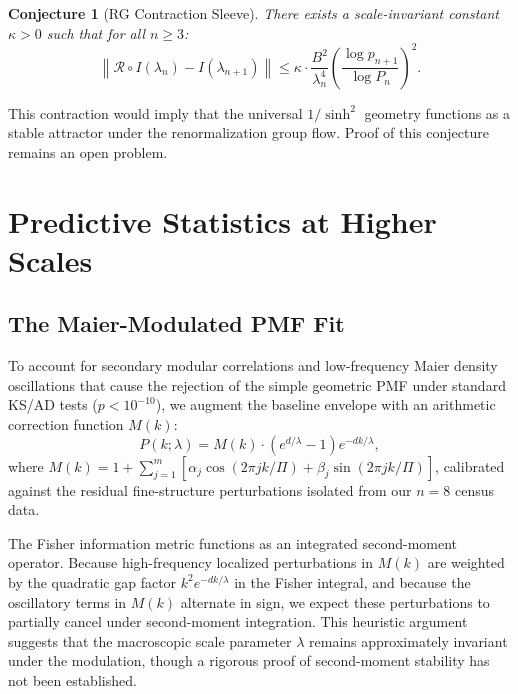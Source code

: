 \documentclass[11pt]{article}
\newtheorem{conjecture}[theorem]{Conjecture}
\theoremstyle{remark}
\begin{document}
\begin{conjecture}[RG Contraction Sleeve]
There exists a scale-invariant constant $\kappa > 0$ such that for all $n \geq 3$:
\begin{equation}
    \left\| \mathcal{R} \circ I(\lambda_n) - I(\lambda_{n+1}) \right\| \le \kappa \cdot \frac{B^2}{\lambda_n^4} \left( \frac{\log p_{n+1}}{\log P_n} \right)^2.
\end{equation}
\end{conjecture}

This contraction would imply that the universal $1/\sinh^2$ geometry functions as a stable attractor under the renormalization group flow. Proof of this conjecture remains an open problem.

\section{Predictive Statistics at Higher Scales}

\subsection{The Maier-Modulated PMF Fit}
To account for secondary modular correlations and low-frequency Maier density oscillations that cause the rejection of the simple geometric PMF under standard KS/AD tests ($p < 10^{-10}$), we augment the baseline envelope with an arithmetic correction function $M(k)$:
\begin{equation}
    P(k; \lambda) = M(k) \cdot \left(e^{d/\lambda} - 1\right) e^{-dk/\lambda},
\end{equation}
where $M(k) = 1 + \sum_{j=1}^{m} [ \alpha_j \cos(2\pi j k / \Pi) + \beta_j \sin(2\pi j k / \Pi) ]$, calibrated against the residual fine-structure perturbations isolated from our $n=8$ census data.

The Fisher information metric functions as an integrated second-moment operator. Because high-frequency localized perturbations in $M(k)$ are weighted by the quadratic gap factor $k^2 e^{-dk/\lambda}$ in the Fisher integral, and because the oscillatory terms in $M(k)$ alternate in sign, we expect these perturbations to partially cancel under second-moment integration. This heuristic argument suggests that the macroscopic scale parameter $\lambda$ remains approximately invariant under the modulation, though a rigorous proof of second-moment stability has not been established.
\end{document}

